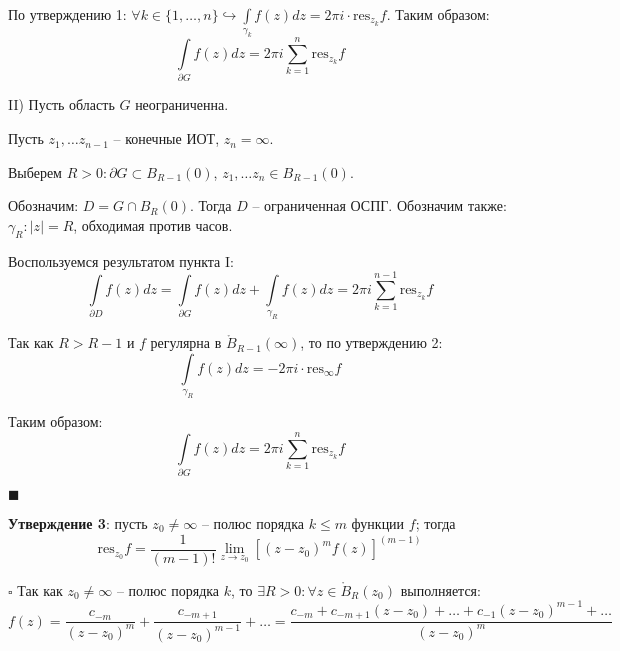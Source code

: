 \documentclass[12pt, a4paper, reqno]{article}
\begin{document}
    По утверждению 1: $\forall k \in \{1, \ldots, n\} \hookrightarrow
    \int\limits_{\gamma_k} f(z)dz = 2\pi i \cdot \text{res}_{z_k} f$. Таким образом:
    \begin{equation*}
        \int\limits_{\partial G} f(z)dz = 2\pi i \sum\limits_{k = 1}^{n} \text{res}_{z_k} f
    \end{equation*}

    II) Пусть область $G$ неограниченна.

    Пусть $z_1, \ldots z_{n - 1}$ -- конечные ИОТ, $z_n = \infty$.

    Выберем $R > 0: \partial G \subset B_{R - 1}(0)$, $z_1, \ldots z_n \in B_{R - 1}(0)$.

    Обозначим: $D = G \cap B_R(0)$. Тогда $D$ -- ограниченная ОСПГ. Обозначим также: $\gamma_R: |z| = R$,
    обходимая против часов.

    Воспользуемся результатом пункта I:
    \begin{equation*}
        \int\limits_{\partial D} f(z)dz = \int\limits_{\partial G} f(z)dz + \int\limits_{\gamma_R} f(z)dz =
        2\pi i \sum\limits_{k = 1}^{n - 1} \text{res}_{z_k} f
    \end{equation*}

    Так как $R > R - 1$ и $f$ регулярна в $\mathring B_{R - 1}(\infty)$, то по утверждению 2:
    \begin{equation*}
        \int\limits_{\gamma_R} f(z)dz = -2\pi i \cdot \text{res}_{\infty} f
    \end{equation*}

    Таким образом:
    \begin{equation*}
        \int\limits_{\partial G} f(z)dz = 2\pi i \sum\limits_{k = 1}^{n} \text{res}_{z_k} f
    \end{equation*}

    $\blacksquare$

    \textbf{Утверждение 3}: пусть $z_0 \neq \infty$ -- полюс порядка $k \leq m$ функции $f$; тогда
    \begin{equation*}
        \text{res}_{z_0} f = \frac{1}{(m - 1)!}\lim\limits_{z \to z_0} [(z - z_0)^m f(z)]^{(m - 1)}
    \end{equation*}

    $\square$ Так как $z_0 \neq \infty$ -- полюс порядка $k$, то $\exists R > 0: \forall z \in
    \mathring B_R(z_0)$ выполняется:
    \begin{equation*}
        f(z) = \frac{c_{-m}}{(z - z_0)^m} + \frac{c_{-m + 1}}{(z - z_0)^{m - 1}} + \ldots =
        \frac{c_{-m} + c_{-m + 1}(z - z_0) + \ldots + c_{-1}(z - z_0)^{m - 1} + \ldots}{(z - z_0)^m}
    \end{equation*}
\end{document}
